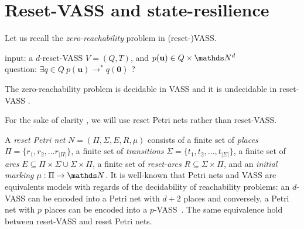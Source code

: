 

\section{Reset-VASS and state-resilience}\label{appendix}






Let us recall the {\em zero-reachability} problem in (reset-)VASS.

\noindent
input: a $d$-reset-VASS $V=(Q,T)$, and $p(\textbf{u}) \in Q \times \N^d$ \\
question:  $\exists q \in Q ~ p(\textbf{u}) \to^* q(\textbf{0})$ ?

The zero-reachability problem is decidable in VASS and it is undecidable in reset-VASS \cite{araki1976PN}.

For the sake of clarity , we will use reset Petri nets \cite{dufourd1998reset} rather than reset-VASS. 

A \emph{reset Petri net} $N = (\Pi, \Sigma, E, R, \mu)$ consists of a finite set of {\em places} $\Pi = \{r_1, r_2, ... r_{|\Pi|}\}$, a finite set of {\em transitions} $\Sigma = \{t_1, t_2, ..., t_{|\Sigma|} \}$, a finite set of {\em arcs} $E \subseteq \Pi \times \Sigma \cup \Sigma \times \Pi$, a finite set of
{\em reset-arcs} $R \subseteq \Sigma \times \Pi$, and an {\em initial marking} $\mu : \Pi \to \N$.
It is well-known that Petri nets and VASS are equivalents models with regards of the decidability of reachability problems: an $d$-VASS can be encoded into a Petri net with $d+2$ places and conversely, a Petri net with $p$ places can be encoded into a $p$-VASS~\cite{DBLP:journals/siglog/Schmitz16}. The same equivalence hold between reset-VASS and reset Petri nets.


